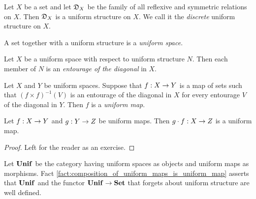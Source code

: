 \documentclass[10pt]{amsart}
\begin{document}
\begin{example}\label{example:discrete_uniform_structure}
	Let $X$ be a set and let ${\mathfrak D}_X$ be the family of all reflexive and symmetric relations on $X$. Then ${\mathfrak D}_X$ is a uniform structure on $X$. We call it the \textit{discrete} uniform structure on $X$.
\end{example}

\begin{definition}
	A set together with a uniform structure is a \textit{uniform space}.
\end{definition}

\begin{definition}
	Let $X$ be a uniform space with respect to uniform structure $N$. Then each member of $N$ is an \textit{entourage of the diagonal} in $X$.
\end{definition}

\begin{definition}
	Let $X$ and $Y$ be uniform spaces. Suppose that $f:X\rightarrow Y$ is a map of sets such that $\left(f\times f\right)^{-1}(V)$ is an entourage of the diagonal in $X$ for every entourage $V$ of the diagonal in $Y$. Then $f$ is a \textit{uniform map}.
\end{definition}

\begin{fact}\label{fact:composition_of_uniform_maps_is_uniform_map}
	Let $f:X \rightarrow Y$ and $g:Y \rightarrow Z$ be uniform maps. Then $g\cdot f:X\rightarrow Z$ is a uniform map.
\end{fact}
\begin{proof}
	Left for the reader as an exercise.
\end{proof}
\noindent
Let $\mathbf{Unif}$ be the category having uniform spaces as objects and uniform maps as morphisms. Fact \ref{fact:composition_of_uniform_maps_is_uniform_map} asserts that $\mathbf{Unif}$ and the functor $\mathbf{Unif} \rightarrow \mathbf{Set}$ that forgets about uniform structure are well defined.
\end{document}
